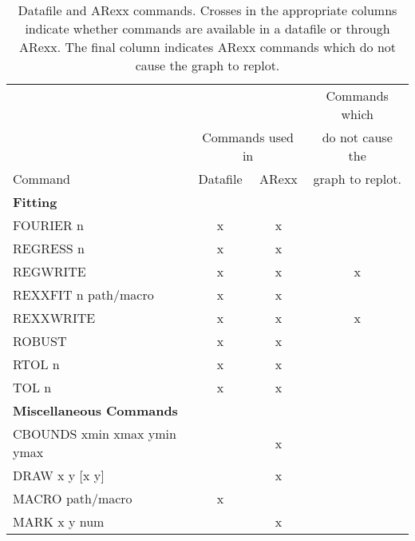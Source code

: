 \documentclass{report}
\begin{document}
\begin{table}[h]
\begin{center}
\scriptsize
\begin{tabular}{lccc} \hline
                                 &           &        & Commands which     \\
                                 & \multicolumn{2}{c}{Commands used in} %
                                                      & do not cause the   \\ \cline{2-3}
Command                          & Datafile  & ARexx  & graph to replot.   \\ \hline
{\bf Fitting}                    &           &        &                    \\
FOURIER  n                       &     x     &     x  &                    \\
REGRESS  n                       &     x     &     x  &                    \\
REGWRITE                         &     x     &     x  &       x            \\
REXXFIT  n   path/macro          &     x     &     x  &                    \\
REXXWRITE                        &     x     &     x  &       x            \\
ROBUST                           &     x     &     x  &                    \\
RTOL  n                          &     x     &     x  &                    \\
TOL  n                           &     x     &     x  &                    \\ \hline
{\bf Miscellaneous Commands}     &           &        &                    \\
CBOUNDS xmin xmax ymin ymax      &           &     x  &                    \\
DRAW  x   y  [x   y]             &           &     x  &                    \\
MACRO  path/macro                &     x     &        &                    \\
MARK  x   y   num                &           &     x  &                    \\ \hline
\end{tabular}           
\end{center}
\caption[Datafile and ARexx commands]{\label{tab:commands}Datafile and ARexx 
commands. Crosses 
in the appropriate columns indicate whether commands are available in a 
datafile or through ARexx. The final column indicates ARexx commands 
which do not cause the graph to replot.}
\end{table}
\clearpage
\end{document}
